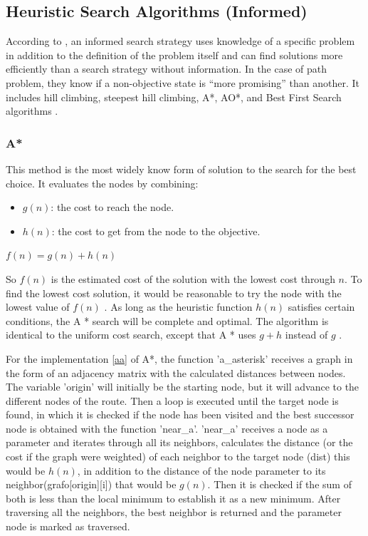\documentclass[11pt]{article}
\begin{document}
    \subsection{Heuristic Search Algorithms (Informed)}
    According to \cite{russell2004inteligencia}, an informed search strategy uses knowledge of a specific problem in addition to the definition of the problem itself and can find solutions more efficiently than a search strategy without information. In the case of path problem, they know if a non-objective state is “more promising” than another. It includes hill climbing, steepest hill climbing, A*, AO*, and Best First Search algorithms \cite{Maharshi2018ComparativeAO}.
        \subsubsection{A*}
        This method is the most widely know form of solution to the search for the best choice.
        It evaluates the nodes by combining:
        \begin{itemize}
            \item $g(n)$: the cost to reach the node. 
            \item $h(n)$: the cost to get from the node to the objective.
        \end{itemize}
        \begin{center}
            $f(n) = g(n) + h(n)$
        \end{center}
        So $f(n)$ is the estimated cost of the solution with the lowest cost through $n$.
        To find the lowest cost solution, it would be reasonable to try the node with the lowest value of $f(n)$ . As long as the heuristic function $h(n)$ satisfies certain conditions, the A * search will be complete and optimal. The algorithm is identical to the uniform cost search, except that A * uses $g + h$ instead of $g$ \cite{russell2004inteligencia}.
        
        For the implementation \ref{aa} of A*, the function 'a\_asterisk' receives a graph in the form of an adjacency matrix with the calculated distances between nodes.
        The variable 'origin' will initially be the starting node, but it will advance to the different nodes of the route. Then a loop is executed until the target node is found, in which it is checked if the node has been visited and the best successor node is obtained with the function 'near\_a'. 
        'near\_a' receives a node as a parameter and iterates through all its neighbors, calculates the distance (or the cost if the graph were weighted) of each neighbor to the target node (dist) this would be $h(n)$, in addition to the distance of the node parameter to its neighbor(grafo[origin][i]) that would be $g(n)$. Then it is checked if the sum of both is less than the local minimum to establish it as a new minimum. After traversing all the neighbors, the best neighbor is returned and the parameter node is marked as traversed.
        
\end{document}
